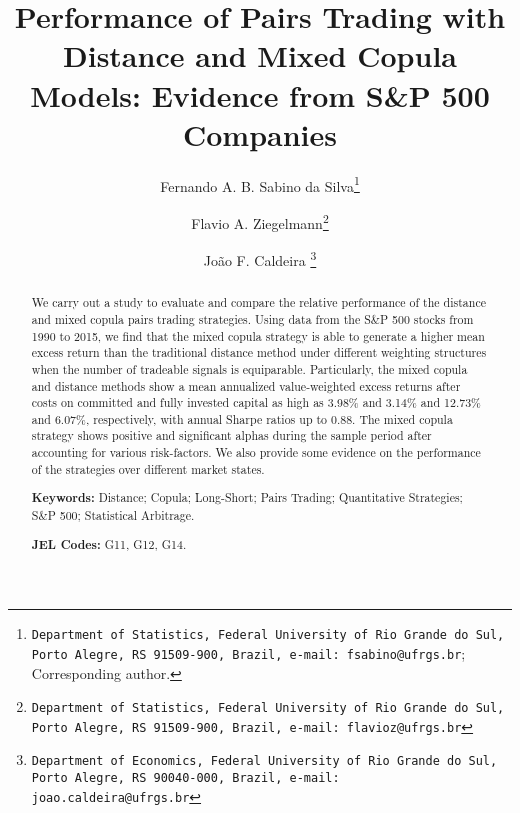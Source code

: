 \documentclass[a4paper]{article}
\begin{document}
	
	
	\makeatletter
	\def\@maketitle{%
		\newpage
		\null
		\vskip 2em%
		\begin{center}%
			\let \footnote \thanks
			{\Large\bfseries \@title \par}%
			\vskip 1.5em%
			{\normalsize
				\lineskip .5em%
				\begin{tabular}[t]{c}%
					\@author
				\end{tabular}\par}%
			\vskip 1em%
			{\normalsize \@date}%
		\end{center}%
		\par
		\vskip 1.5em}
	\makeatother
	
	\title{Performance of Pairs Trading with Distance and Mixed Copula Models: Evidence from S\&P 500 Companies}
	\author[]{ Fernando A. B. Sabino da Silva\thanks{\texttt{Department of Statistics, Federal University of Rio Grande do Sul, Porto Alegre, RS 91509-900, Brazil, e-mail: fsabino@ufrgs.br}; Corresponding author.}}
	\author[]{Flavio A. Ziegelmann\thanks{\texttt{Department of Statistics, Federal University of Rio Grande do Sul, Porto Alegre, RS 91509-900, Brazil, e-mail: flavioz@ufrgs.br}}}
	\author[]{João F. Caldeira \thanks{\texttt{Department of Economics, Federal University of Rio Grande do Sul, Porto Alegre, RS 90040-000, Brazil, e-mail: joao.caldeira@ufrgs.br}}}
	\affil[]{}
	\date{}
	\maketitle
	
	
	\begin{abstract}
		We carry out a study to evaluate and compare the relative performance of the distance and mixed copula pairs trading strategies. Using data from the S\&P 500 stocks from 1990 to 2015, we find that the mixed copula strategy is able to generate a higher mean excess return than the traditional distance method under different weighting structures when the number of tradeable signals is equiparable. Particularly, the mixed copula and distance methods show a mean annualized value-weighted excess returns after costs on committed and fully invested capital as high as 3.98\% and 3.14\% and 12.73\% and 6.07\%, respectively, with annual Sharpe ratios up to 0.88. The mixed copula strategy shows positive and significant alphas during the sample period after accounting for various risk-factors. We also provide some evidence on the performance of the strategies over different market states. 
		
		\smallskip
		
		\noindent \textbf{Keywords:} Distance; Copula; Long-Short; Pairs Trading; Quantitative Strategies; S\&P 500; Statistical Arbitrage.
		
		\noindent \textbf{JEL Codes:} G11, G12, G14.
	\end{abstract}
	
\end{document}
